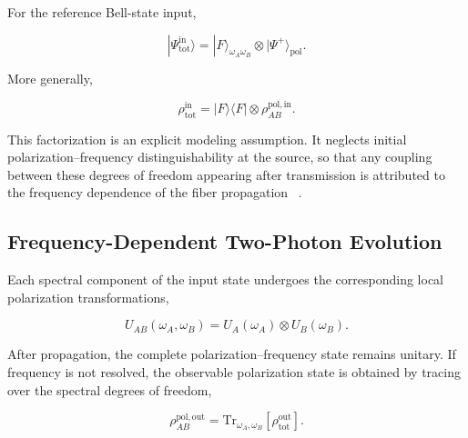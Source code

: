 For the reference Bell-state input,

\begin{equation}
|\Psi_{\mathrm{tot}}^{\mathrm{in}}\rangle
=
|F\rangle_{\omega_A\omega_B}
\otimes
|\Psi^+\rangle_{\mathrm{pol}}.
\label{eq:factorized_spectral_polarization_input_ket}
\end{equation}

More generally,

\begin{equation}
\rho_{\mathrm{tot}}^{\mathrm{in}}
=
|F\rangle\langle F|
\otimes
\rho_{AB}^{\mathrm{pol,in}}.
\label{eq:factorized_spectral_polarization_input}
\end{equation}

This factorization is an explicit modeling assumption. It neglects initial
polarization--frequency distinguishability at the source, so that any coupling
between these degrees of freedom appearing after transmission is attributed to
the frequency dependence of the fiber propagation
~\cite{poon_law_stochastic_pmd_2008,
riccardi_polarization_entanglement_distribution_2021}.



\subsection{Frequency-Dependent Two-Photon Evolution}
\label{subsec:frequency_dependent_two_photon_evolution}

Each spectral component of the input state undergoes the corresponding local
polarization transformations,

\begin{equation}
U_{AB}(\omega_A,\omega_B)
=
U_A(\omega_A)
\otimes
U_B(\omega_B).
\label{eq:frequency_dependent_two_photon_operator}
\end{equation}

After propagation, the complete polarization--frequency state remains unitary.
If frequency is not resolved, the observable polarization state is obtained by
tracing over the spectral degrees of freedom,

\begin{equation}
\rho_{AB}^{\mathrm{pol,out}}
=
\mathrm{Tr}_{\omega_A,\omega_B}
\left[
\rho_{\mathrm{tot}}^{\mathrm{out}}
\right].
\label{eq:two_photon_spectral_partial_trace}
\end{equation}

